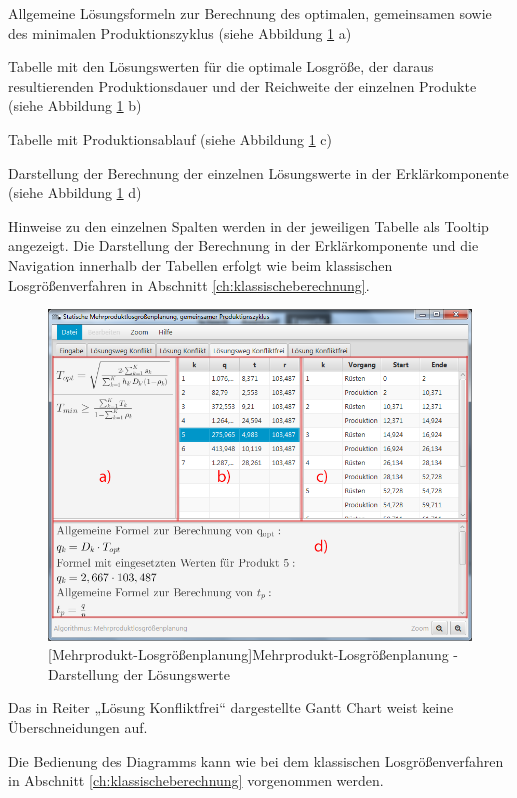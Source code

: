 \begin{compactitem}
\item Allgemeine Lösungsformeln zur Berechnung des optimalen, gemeinsamen sowie des minimalen Produktionszyklus (siehe Abbildung \ref{fig:mehrprodukt} a)
	\item Tabelle mit den Lösungswerten für die optimale Losgröße, der daraus resultierenden Produktionsdauer und der Reichweite der einzelnen Produkte (siehe Abbildung \ref{fig:mehrprodukt} b)
	\item Tabelle mit Produktionsablauf (siehe Abbildung \ref{fig:mehrprodukt} c)
	\item Darstellung der Berechnung der einzelnen Lösungswerte in der Erklärkomponente (siehe Abbildung \ref{fig:mehrprodukt} d)
\end{compactitem}

Hinweise zu den einzelnen Spalten werden in der jeweiligen Tabelle als Tooltip angezeigt.  Die Darstellung der Berechnung in der Erklärkomponente und die Navigation innerhalb der Tabellen erfolgt wie beim klassischen Losgrößenverfahren in Abschnitt \ref{ch:klassischeberechnung}.
\begin{figure}[H]
	\centering
	\includegraphics[width=0.8\linewidth]{Bilder/Mehrprodukt.png} 
	[Mehrprodukt-Losgrößenplanung]{Mehrprodukt-Losgrößenplanung - Darstellung der Lösungswerte}
	\label{fig:mehrprodukt}
\end{figure}

Das in Reiter „Lösung Konfliktfrei“ dargestellte Gantt Chart weist keine Überschneidungen auf.

Die Bedienung des Diagramms kann wie bei dem klassischen Losgrößenverfahren in Abschnitt \ref{ch:klassischeberechnung} vorgenommen werden.

